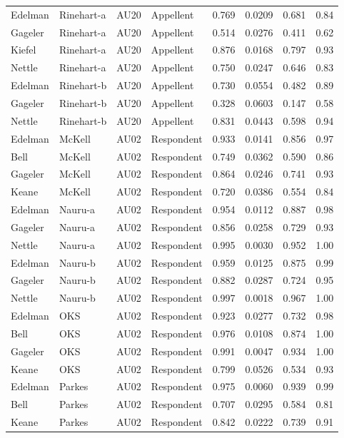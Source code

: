 \documentclass{monashthesis}
\begin{document}
\begin{center}
\begin{longtable}{llllllll}
Edelman & Rinehart-a & AU20 & Appellent & 0.769 & 0.0209 & 0.681 & 0.84 \\
Gageler & Rinehart-a & AU20 & Appellent & 0.514 & 0.0276 & 0.411 & 0.62 \\
Kiefel & Rinehart-a & AU20 & Appellent & 0.876 & 0.0168 & 0.797 & 0.93 \\
Nettle & Rinehart-a & AU20 & Appellent & 0.750 & 0.0247 & 0.646 & 0.83 \\
Edelman & Rinehart-b & AU20 & Appellent & 0.730 & 0.0554 & 0.482 & 0.89 \\
Gageler & Rinehart-b & AU20 & Appellent & 0.328 & 0.0603 & 0.147 & 0.58 \\
Nettle & Rinehart-b & AU20 & Appellent & 0.831 & 0.0443 & 0.598 & 0.94 \\
Edelman & McKell & AU02 & Respondent & 0.933 & 0.0141 & 0.856 & 0.97 \\
Bell & McKell & AU02 & Respondent & 0.749 & 0.0362 & 0.590 & 0.86 \\
Gageler & McKell & AU02 & Respondent & 0.864 & 0.0246 & 0.741 & 0.93 \\
Keane & McKell & AU02 & Respondent & 0.720 & 0.0386 & 0.554 & 0.84 \\
Edelman & Nauru-a & AU02 & Respondent & 0.954 & 0.0112 & 0.887 & 0.98 \\
Gageler & Nauru-a & AU02 & Respondent & 0.856 & 0.0258 & 0.729 & 0.93 \\
Nettle & Nauru-a & AU02 & Respondent & 0.995 & 0.0030 & 0.952 & 1.00 \\
Edelman & Nauru-b & AU02 & Respondent & 0.959 & 0.0125 & 0.875 & 0.99 \\
Gageler & Nauru-b & AU02 & Respondent & 0.882 & 0.0287 & 0.724 & 0.95 \\
Nettle & Nauru-b & AU02 & Respondent & 0.997 & 0.0018 & 0.967 & 1.00 \\
Edelman & OKS & AU02 & Respondent & 0.923 & 0.0277 & 0.732 & 0.98 \\
Bell & OKS & AU02 & Respondent & 0.976 & 0.0108 & 0.874 & 1.00 \\
Gageler & OKS & AU02 & Respondent & 0.991 & 0.0047 & 0.934 & 1.00 \\
Keane & OKS & AU02 & Respondent & 0.799 & 0.0526 & 0.534 & 0.93 \\
Edelman & Parkes & AU02 & Respondent & 0.975 & 0.0060 & 0.939 & 0.99 \\
Bell & Parkes & AU02 & Respondent & 0.707 & 0.0295 & 0.584 & 0.81 \\
Keane & Parkes & AU02 & Respondent & 0.842 & 0.0222 & 0.739 & 0.91 \\

\end{longtable}
\end{center}
\end{document}
